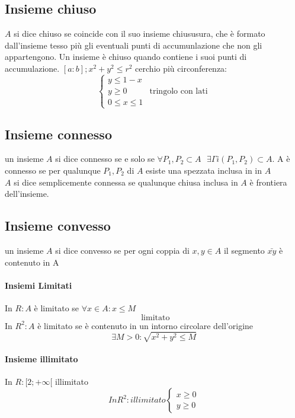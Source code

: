 \subsection{Insieme chiuso}
\begin{defi}
  $A$ si dice chiuso se coincide con il suo insieme chiususura, che è formato dall'insieme tesso più gli
  eventuali punti di accumunlazione che non gli appartengono. Un insieme è chiuso quando contiene i suoi punti
  di accumulazione. $[a:b]; x^2+y^2\leq r^2$ cerchio più circonferenza:
  \begin{equation}
    \begin{cases}
        y\leq 1-x\\
        y\geq 0& \text{tringolo con lati}\\
        0\leq x\leq 1
    \end{cases} 
  \end{equation}
\end{defi}
\subsection{Insieme connesso}
\begin{defi}
  un insieme $A$ si dice connesso se e solo se $\forall P_1,P_2\subset A \text{ }
  \exists \Gamma i(P_1,P_2)\subset A$. A è connesso se per qualunque $P_1,P_2$ di $A$ esiste una spezzata
  inclusa in in $A$\\
  $A$ si dice {\color{red} semplicemente connessa} se qualunque chiusa inclusa in $A$ è frontiera dell'insieme.
\end{defi}
\subsection{Insieme convesso}
\begin{defi}
  un insieme $A$ si dice convesso se per ogni coppia di $x,y\in A$ il segmento $\bar{xy}$ è contenuto in A
\end{defi}
\begin{multicols}{2}
  \paragraph{Insiemi Limitati}
  In $R:A$ è limitato se $\forall x \in A:x\leq M$
  \begin{equation*}
    [-1;1]\text{ limitato}
  \end{equation*}
  In $R^2: A$ è limitato se è contenuto in un intorno circolare dell'origine
  \begin{equation}
    \exists M>0: \sqrt{x^2+y^2\leq M}
  \end{equation}
  \paragraph{Insieme illimitato}
  In $R: [2;+\infty [$ illimitato
  \begin{equation}
    In R^2: illimitato \begin{cases}
                         x\geq 0\\
                         y\geq 0
                       \end{cases}
  \end{equation}                     
\end{multicols}
